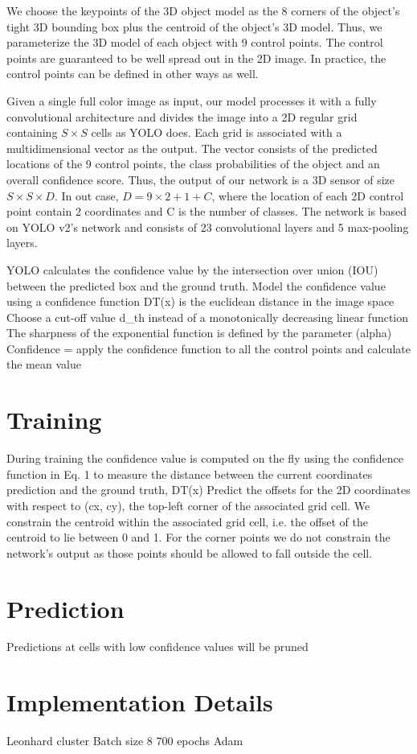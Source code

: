 We choose the keypoints of the 3D object model as the 8 corners of the object's tight 3D bounding box plus the centroid of the object's 3D model. Thus, we parameterize the 3D model of each object with 9 control points. The control points are guaranteed to be well spread out in the 2D image. In practice, the control points can be defined in other ways as well.

Given a single full color image as input, our model processes it with a fully convolutional architecture and divides the image into a 2D regular grid containing $ S \times S $ cells as YOLO does. Each grid is associated with a multidimensional vector as the output. The vector consists of the predicted locations of the 9 control points, the class probabilities of the object and an overall confidence score. Thus, the output of our network is a 3D sensor of size $ S \times S \times D $. In out case, $D = 9\times2+1+C$, where the location of each 2D control point contain 2 coordinates and C is the number of classes. The network is based on YOLO v2's network and consists of 23 convolutional layers and 5 max-pooling layers.

YOLO calculates the confidence value by the intersection over union (IOU) between the predicted box and the ground truth.
Model the confidence value using a confidence function
DT(x) is the euclidean distance in the image space
Choose a cut-off value d\_th instead of a monotonically decreasing linear function
The sharpness of the exponential function is defined by the parameter (alpha)
Confidence =  apply the confidence function to all the control points and calculate the mean value



\section{Training}
During training the confidence value is computed on the fly using the confidence function in Eq. 1 to measure the distance between the current coordinates prediction and the ground truth, DT(x)
Predict the offsets for the 2D coordinates with respect to (cx, cy), the top-left corner of the associated grid cell.
We constrain the centroid within the associated grid cell, i.e. the offset of the centroid to lie between 0 and 1. For the corner points we do not constrain the network’s output as those points should be allowed to fall outside the cell.

\section{Prediction}
Predictions at cells with low confidence values will be pruned

\section{Implementation Details}

Leonhard cluster
Batch size 8
700 epochs
Adam 


